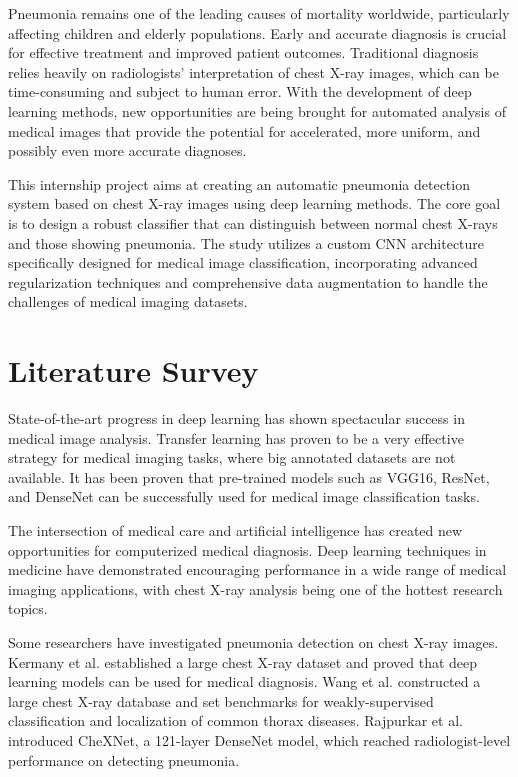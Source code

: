 \documentclass[conference]{IEEEtran}
\begin{document}
Pneumonia remains one of the leading causes of mortality worldwide, particularly affecting children and elderly populations. Early and accurate diagnosis is crucial for effective treatment and improved patient outcomes. Traditional diagnosis relies heavily on radiologists' interpretation of chest X-ray images, which can be time-consuming and subject to human error. With the development of deep learning methods, new opportunities are being brought for automated analysis of medical images that provide the potential for accelerated, more uniform, and possibly even more accurate diagnoses.

This internship project aims at creating an automatic pneumonia detection system based on chest X-ray images using deep learning methods. The core goal is to design a robust classifier that can distinguish between normal chest X-rays and those showing pneumonia. The study utilizes a custom CNN architecture specifically designed for medical image classification, incorporating advanced regularization techniques and comprehensive data augmentation to handle the challenges of medical imaging datasets.

\section{Literature Survey}

State-of-the-art progress in deep learning has shown spectacular success in medical image analysis. Transfer learning has proven to be a very effective strategy for medical imaging tasks, where big annotated datasets are not available. It has been proven that pre-trained models such as VGG16, ResNet, and DenseNet can be successfully used for medical image classification tasks.

The intersection of medical care and artificial intelligence has created new opportunities for computerized medical diagnosis. Deep learning techniques in medicine have demonstrated encouraging performance in a wide range of medical imaging applications, with chest X-ray analysis being one of the hottest research topics.

Some researchers have investigated pneumonia detection on chest X-ray images. Kermany et al. established a large chest X-ray dataset and proved that deep learning models can be used for medical diagnosis. Wang et al. constructed a large chest X-ray database and set benchmarks for weakly-supervised classification and localization of common thorax diseases. Rajpurkar et al. introduced CheXNet, a 121-layer DenseNet model, which reached radiologist-level performance on detecting pneumonia.
\end{document}

